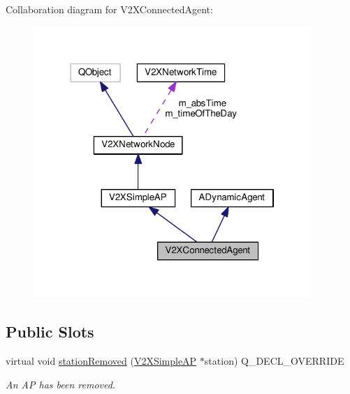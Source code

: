 Collaboration diagram for V2\+X\+Connected\+Agent\+:\nopagebreak
\begin{figure}[H]
\begin{center}
\leavevmode
\includegraphics[width=298pt]{classV2XConnectedAgent__coll__graph}
\end{center}
\end{figure}
\subsection*{Public Slots}
\begin{DoxyCompactItemize}
\item 
virtual void \hyperlink{classV2XConnectedAgent_a55bacb33165aa33c039420348cb0bfb8}{station\+Removed} (\hyperlink{classV2XSimpleAP}{V2\+X\+Simple\+AP} $\ast$station) Q\+\_\+\+D\+E\+C\+L\+\_\+\+O\+V\+E\+R\+R\+I\+DE
\begin{DoxyCompactList}\small\item\em An AP has been removed. \end{DoxyCompactList}\end{DoxyCompactItemize}
